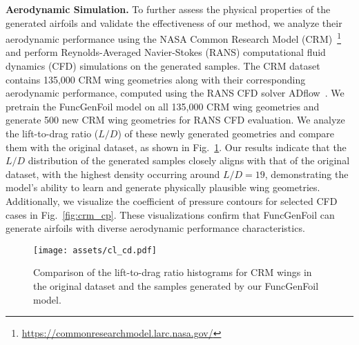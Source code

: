 \noindent\textbf{Aerodynamic Simulation.}
To further assess the physical properties of the generated airfoils and validate the effectiveness of our method, we analyze their aerodynamic performance using the NASA Common Research Model (CRM)~\footnote{\url{https://commonresearchmodel.larc.nasa.gov/}} and perform Reynolds-Averaged Navier-Stokes (RANS) computational fluid dynamics (CFD) simulations on the generated samples.
The CRM dataset contains 135,000 CRM wing geometries along with their corresponding aerodynamic performance, computed using the RANS CFD solver ADflow~\cite{Mader2020a}.
We pretrain the FuncGenFoil model on all 135,000 CRM wing geometries and generate 500 new CRM wing geometries for RANS CFD evaluation. We analyze the lift-to-drag ratio ($L/D$) of these newly generated geometries and compare them with the original dataset, as shown in Fig.~\ref{fig:crm_lift_drag}. 
Our results indicate that the $L/D$ distribution of the generated samples closely aligns with that of the original dataset, with the highest density occurring around $L/D = 19$, demonstrating the model's ability to learn and generate physically plausible wing geometries. Additionally, we visualize the coefficient of pressure contours for selected CFD cases in Fig.~\ref{fig:crm_cp}. These visualizations confirm that FuncGenFoil can generate airfoils with diverse aerodynamic performance characteristics.

\begin{figure}[t]
    \small
    \centering
      \texttt{[image: assets/cl\_cd.pdf]}
      \caption{Comparison of the lift-to-drag ratio histograms for CRM wings in the original dataset and the samples generated by our FuncGenFoil model.}
      \label{fig:crm_lift_drag}
      \vspace{-10pt}
\end{figure}


